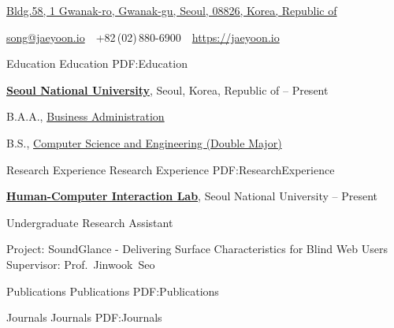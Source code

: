 \documentclass[letterpaper,MMMyyyy,nonstopmode]{simpleresumecv}
\newcommand{\CVAuthor}{Jaeyoon Song}
\newcommand{\CVWebpage}{https://jaeyoon.io}
\begin{document}

\Title{\CVAuthor}

\begin{SubTitle}
\href{https://www.google.com/maps/place/1+Gwanak-ro,+Daehak-dong,+Gwanak-gu,+Seoul,+South+Korea}
{Bldg.58, 1 Gwanak-ro, Gwanak-gu, Seoul, 08826, Korea, Republic of}
\par
\href{mailto:song@jaeyoon.io}
{song@jaeyoon.io}
\,\SubBulletSymbol\,
+82\,(02)\,880-6900
\,\SubBulletSymbol\,
\href{\CVWebpage}
{\url{\CVWebpage}}
\end{SubTitle}

\begin{Body}


\Section
{Education}
{Education}
{PDF:Education}

\Entry
\href{http://www.snu.ac.kr}
{\textbf{Seoul National University}},
Seoul, Korea, Republic of
\hfill
{} --
Present

\Gap
\BulletItem
B.A.A.,
\href{http://cba.snu.ac.kr}
{Business Administration}

\Gap
\BulletItem
B.S.,
\href{http://cse.snu.ac.kr}
{Computer Science and Engineering (Double Major)}



\Section
{Research Experience}
{Research Experience}
{PDF:ResearchExperience}

\Entry
\href{http://hcil.snu.ac.kr/}
{\textbf{Human-Computer Interaction Lab}},
Seoul National University
\hfill
{} --
Present

\Gap
\BulletItem
Undergraduate Research Assistant
\begin{Detail}
\SubBulletItem
Project:
SoundGlance - Delivering Surface Characteristics for Blind Web Users
\SubBulletItem
Supervisor:
Prof.~Jinwook~Seo
\end{Detail}


\Section
{Publications}
{Publications}
{PDF:Publications}

\SubSection
{Journals}
{Journals}
{PDF:Journals}

\begingroup
\renewcommand{\MaxNumberedItem}{[88]}


\end{Body}
\end{document}
